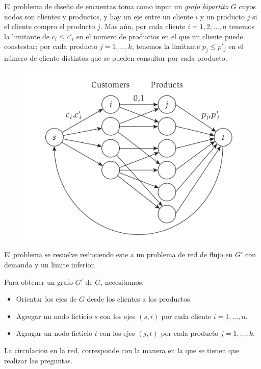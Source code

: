 \documentclass{article}
\begin{document}
El problema de diseño de encuentas toma como input un \textit{grafo bipartito} \(G\) cuyos nodos son 
clientes y productos, y hay un eje entre un cliente \(i\) y un producto \(j\) si el cliente compro el producto \(j\).
Mas aún, por cada cliente \(i=1,2,...,n\) tenemos la limitante de \(c_i \leq c'_i\) en el numero de productos en el que un 
cliente puede constestar; por cada producto \(j=1,...,k\), tenemos la limitante \(p_j \leq p'_j\) en el 
número de cliente distintos que se pueden consultar por cada producto.

\begin{figure}[h!]
    \includegraphics[width=\linewidth]{imagenes/grafo-encuesta.png}
\end{figure}

El problema se resuelve reduciendo este a un problema de red de flujo en \(G'\) con demanda y un limite inferior. 

Para obtener un grafo \(G'\) de \(G\), necesitamos:
\begin{itemize}
    \item Orientar los ejes de \(G\) desde los clientes a los productos.
    \item Agregar un nodo ficticio \(s\) con los ejes \((s,i)\) por cada cliente \(i=1,...,n\).
    \item Agragar un nodo ficticio \(t\) con los ejes \((j,t)\) por cada producto \(j=1,...,k\).
\end{itemize}

La circulacion en la red, corresponde con la manera en la que se tienen que realizar las preguntas.
\end{document}
